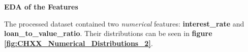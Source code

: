 
\textbf{EDA of the Features}

The processed dataset contained two \textit{numerical} features: \textbf{interest\_rate} and \textbf{loan\_to\_value\_ratio}.
Their distributions can be seen in \textbf{figure \ref{fig:CHXX_Numerical_Distributions_2}}.


